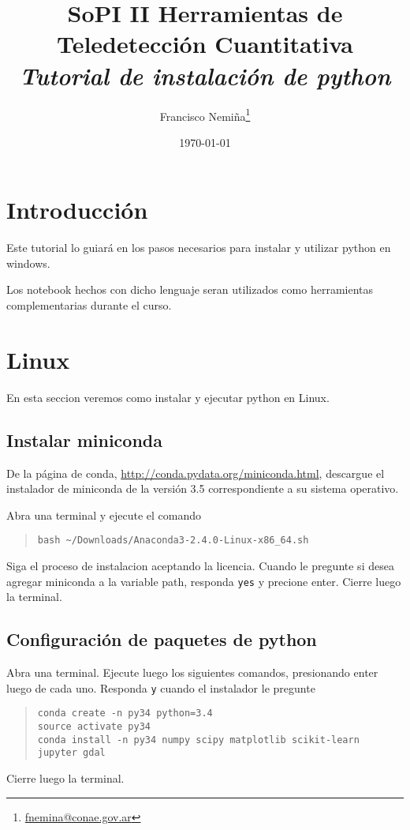 \documentclass[hidelinks,12pt]{article}
\title{SoPI II \- Herramientas de Teledetecci\'on Cuantitativa \\ 
\emph{Tutorial de instalaci\'on de python}}
\author{Francisco
Nemi\~na\thanks{\href{mailto:fnemina@conae.govar}{fnemina@conae.gov.ar}}}
\affil{Unidad de Educaci\'on y Formaci\'on Masiva\\ 
    Comisi\'on Nacional de Actividades Espaciales}
\date{\today}
\begin{document}
\maketitle

\section*{Introducci\'on}
Este tutorial lo guiar\'a en los pasos necesarios para instalar y utilizar
python en windows.

Los notebook hechos con dicho lenguaje seran utilizados como herramientas
complementarias durante el curso.

\section{Linux}
En esta seccion veremos como instalar y ejecutar python en Linux.

\subsection{Instalar miniconda}

De la p\'agina de conda, \url{http://conda.pydata.org/miniconda.html}, descargue 
el instalador de miniconda de la versi\'on 3.5 correspondiente a su sistema operativo. 

Abra una terminal y ejecute el comando
\begin{quote}
\begin{verbatim}
bash ~/Downloads/Anaconda3-2.4.0-Linux-x86_64.sh
\end{verbatim}
\end{quote}
Siga el proceso de instalacion aceptando la licencia. Cuando le pregunte si
desea agregar miniconda a la variable path, responda \texttt{yes} y precione
enter. Cierre luego la terminal.

\subsection{Configuraci\'on de paquetes de python}

Abra una terminal. Ejecute luego los siguientes comandos, presionando enter
luego de cada uno. Responda \texttt{y} cuando el instalador le pregunte 
\begin{quote}
\begin{verbatim}
conda create -n py34 python=3.4
source activate py34
conda install -n py34 numpy scipy matplotlib scikit-learn jupyter gdal
\end{verbatim}
\end{quote}
Cierre luego la terminal.
\end{document}
